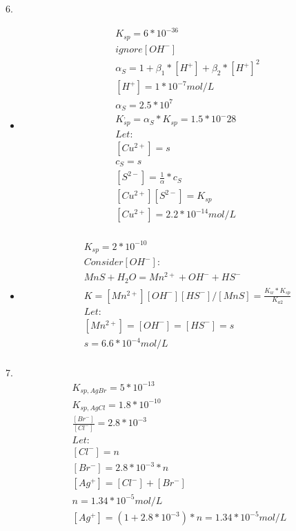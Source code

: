 \documentclass{article}
\begin{document}
6.\begin{itemize}
    \item 
    \begin{equation}
        \begin{multlined}
            K_{sp} = 6*10^{-36}\\
            ignore [OH^-]\\
            \alpha_{S} = 1 + \beta_1*[H^+] + \beta_2*[H^+]^2\\
            [H^+] = 1*10^{-7} mol/L\\
            \alpha_S = 2.5*10^7\\
            K^,_{sp} = \alpha_S*K_{sp} = 1.5*10^-28\\
            Let:\\
            [Cu^{2+}] = s\\
            c_S = s\\
            [S^{2-}] = \frac{1}{\alpha}*c_S\\
            [Cu^{2+}][S^{2-}] = K_{sp}\\
            [Cu^{2+}] = 2.2*10^{-14} mol/L\\
        \end{multlined}
    \end{equation}
    \item
    \begin{equation}
        \begin{multlined}
            K_{sp} = 2*10^{-10}\\
            Consider[OH^-]:\\
            MnS+H_2O = Mn^{2+}+OH^-+HS^-\\
            K = [Mn^{2+}][OH^-][HS^-]/[MnS] = \frac{K_w*K_{sp}}{K_{a2}}\\
            Let:\\
            [Mn^{2+}] = [OH^-] = [HS^-] = s\\
            s = 6.6*10^{-4} mol/L\\
        \end{multlined}
    \end{equation}
\end{itemize}
7.\begin{equation}
    \begin{multlined}
        K_{sp,AgBr} = 5*10^{-13}\\
        K_{sp,AgCl} = 1.8*10^{-10}\\
        \frac{[Br^-]}{[Cl^-]} = 2.8*10^{-3}\\
        Let:\\
        [Cl^-] = n\\
        [Br^-] = 2.8*10^{-3}*n\\
        [Ag^+] = [Cl^-] + [Br^-]\\
        n = 1.34*10^{-5} mol/L\\
        [Ag^+] = (1+2.8*10^{-3})*n = 1.34*10^{-5} mol/L\\
    \end{multlined}
\end{equation}
\end{document}
